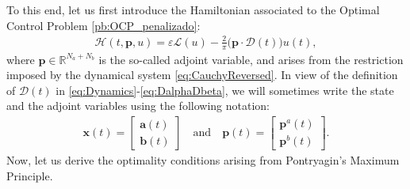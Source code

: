 \documentclass[twocolumn]{autart}    %
\begin{document}
To this end, let us first introduce the Hamiltonian  associated to the Optimal Control Problem \ref{pb:OCP_penalizado}:
\begin{align}\label{eq:hamil}
    \mathcal{H}(t,\bm{p},u) = \varepsilon \mathcal{L}(u) - \frac 2\pi\big(\bm{p} \cdot \bm{\mathcal{D}}(t)\big)u(t),
\end{align}
where $\bm{p}\in \mathbb{R}^{N_a+N_b}$ is the so-called adjoint variable, and arises from the restriction imposed by the dynamical system \eqref{eq:CauchyReversed}. In view of the definition of $\bm{\mathcal{D}}(t)$ in \eqref{eq:Dynamics}-\eqref{eq:DalphaDbeta}, we will sometimes write the state and the adjoint variables using the following notation:
\begin{align*}
  \bm{x}(t) = \begin{bmatrix} \bm{a}(t) \\ \bm{b}(t) \end{bmatrix} \quad \text{and}\quad
  \bm{p}(t) = \begin{bmatrix} \bm{p}^a(t) \\ \bm{p}^b(t) \end{bmatrix}.
\end{align*}
Now, let us derive the optimality conditions arising from Pontryagin's Maximum Principle.
\end{document}
